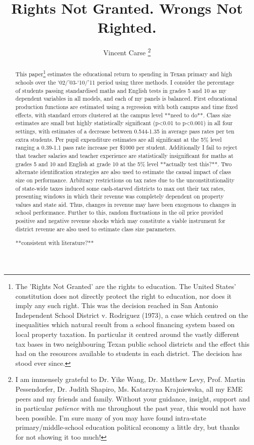 \documentclass[titlepage]{article}
\begin{document}
\title{Rights Not Granted. Wrongs Not Righted.}
\author{Vincent Carse \thanks{I am immensely grateful to Dr. Yike Wang, Dr. Matthew Levy, Prof. Martin Pessendorfer, Dr. Judith Shapiro, Ms. Katarzyna Krajniewska, all my EME peers and my friends and family. Without your guidance, insight, support and in particular \textit{patience} with me throughout the past year, this would not have been possible. I'm sure many of you may have found intra-state primary/middle-school education political economy a little dry, but thanks for not showing it too much!}}
\maketitle
\begin{abstract}

This paper\footnote{The 'Rights Not Granted' are the rights to education. The United States' constitution does not directly protect the right to education, nor does it imply any such right. This was the decision reached in San Antonio Independent School District v. Rodriguez (1973), a case which centred on the inequalities which natural result from a school financing system based on local property taxation. In particular it centred around the vastly different tax bases in two neighbouring Texan public school districts and the effect this had on the resources available to students in each district. The decision has stood ever since.
} estimates the educational return to spending in Texan primary and high schools over the ‘02/’03-‘10/’11 period using three methods. I consider the percentage of students passing standardised maths and English tests in grades 5 and 10 as my dependent variables in all models, and each of my panels is balanced. First educational production functions are estimated using a regression with both campus and time fixed effects, with standard errors clustered at the campus level **need to do**. Class size estimates are small but highly statistically significant (p\textless{0.01} to p\textless{0.001}) in all four settings, with estimates of a decrease between 0.544-1.35 in average pass rates per ten extra students. Per pupil expenditure estimates are all significant at the 5\% level ranging a 0.39-1.1 pass rate increase per \$1000 per student. Additionally I fail to reject that teacher salaries and teacher experience are statistically insignificant for maths at grades 5 and 10 and English at grade 10 at the 5\% level **actually test this?**. Two alternate identification strategies are also used to estimate the causal impact of class size on performance. Arbitrary restrictions on tax rates due to the unconstitutionality of state-wide taxes induced some cash-starved districts to max out their tax rates, presenting windows in which their revenue was completely dependent on property values and state aid. Thus, changes in revenue may have been exogenous to changes in school performance. Further to this, random fluctuations  in the oil price provided positive and negative revenue shocks which may constitute a viable instrument for district revenue are also used to estimate class size parameters.

**consistent with literature?**



\end{abstract}
\end{document}
